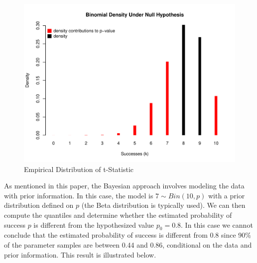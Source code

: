 \documentclass[12pt]{article}
\begin{document}
\begin{figure}[H]\caption[]{Empirical Distribution of t-Statistic}
\centering
\begin{minipage}{0.6\linewidth}
\includegraphics[trim={0cm 0cm 0cm 1.5cm}, clip, scale=0.6]{../figs/bintest_dist.pdf}
\end{minipage}
\end{figure}

\noindent As mentioned in this paper, the Bayesian approach involves modeling the data with prior information. In this case, the model is $7 \sim Bin(10, p)$ with a prior distribution defined on $p$ (the Beta distribution is typically used). We can then compute the quantiles and determine whether the estimated probability of success $p$ is different from the hypothesized value $p_0 = 0.8$. In this case we cannot conclude that the estimated probability of success is different from 0.8 since 90\% of the parameter samples are between 0.44 and 0.86, conditional on the data and prior information. This result is illustrated below. \\
\end{document}
